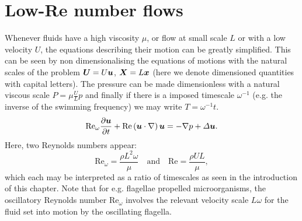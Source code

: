 \section{Low-Re number flows}
Whenever fluids have a high viscosity $\mu$, or flow at small scale $L$ or with a low velocity $U$, the equations describing their motion can be greatly simplified. This can be seen by non dimensionalising the equations of motions with the natural scales of the problem $\bU=U\bu$, $\bX=L\bx$ (here we denote dimensioned quantities with capital letters). The pressure can be made dimensionless with a natural viscous scale $P=\mu\frac{U}{L}p$ and finally if there is a imposed timescale $\omega^{-1}$ (e.g. the inverse of the swimming frequency) we may write $T=\omega^{-1}t$.
\begin{equation}
\mathrm{Re}_\omega\pd{\bu}{t} + \mathrm{Re}\lp\bu\cdot\nabla\rp\bu=-\nabla p+\Delta \bu.
\label{eq:pre-stokes_equation}
\end{equation}
Here, two Reynolds numbers appear:
\begin{equation}
\mathrm{Re}_\omega=\frac{\rho L^2 \omega}{\mu} \quad \text{and} \quad \mathrm{Re}=\frac{\rho U L}{\mu},
\end{equation}
which each may be interpreted as a ratio of timescales as seen in the introduction of this chapter. Note that for e.g. flagellae propelled microorganisms, the oscillatory Reynolds number $\mathrm{Re}_\omega$ involves the relevant velocity scale $L\omega$ for the fluid set into motion by the oscillating flagella.

